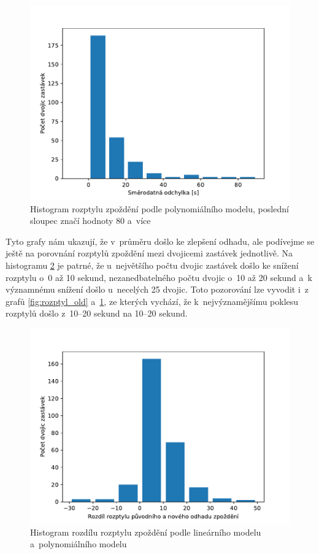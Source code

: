 \begin{figure}
   \centering
 \includegraphics[width=\linewidth]{../img/rozptyl_new}
 \caption{Histogram rozptylu zpoždění podle polynomiálního modelu, poslední sloupec značí hodnoty 80 a~více}
 \label{fig:rozptyl_new}
\end{figure}


\bigbreak

Tyto grafy nám ukazují, že v~průměru došlo ke zlepšení odhadu, ale podívejme se ještě na porovnání rozptylů zpoždění mezi dvojicemi zastávek jednotlivě. Na histogramu \ref{fig:rozptyl_diff} je patrné, že u~největšího počtu dvojic zastávek došlo ke snížení rozptylu o~0 až 10 sekund, nezanedbatelného počtu dvojic o~10 až 20 sekund a~k významnému snížení došlo u~necelých 25 dvojic. Toto pozorování lze vyvodit i~z grafů \ref{fig:rozptyl_old} a~\ref{fig:rozptyl_new}, ze kterých vychází, že k~nejvýznamějšímu poklesu rozptylů došlo z~10--20 sekund na 10--20 sekund.


\begin{figure}
   \centering
 \includegraphics[width=1\linewidth]{../img/rozptyl_diff}
 \caption{Histogram rozdílu rozptylu zpoždění podle lineárního modelu a~polynomiálního modelu}
 \label{fig:rozptyl_diff}
\end{figure}


